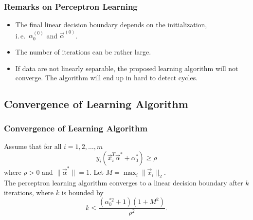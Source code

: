 \begin{frame}
  \frametitle{Remarks on Perceptron Learning \cont}

  \begin{itemize}
    \item The final linear decision boundary depends on the initialization, \\
      i.\,e.\ $\alpha_0^{(0)}$ and $\vec \alpha^{(0)}$. \\[.5cm]
    \item The number of iterations can be rather large. \\[.5cm]
    \item If data are not linearly separable, the proposed learning algorithm will not converge. The algorithm will end up in hard to detect cycles.
  \end{itemize}
\end{frame}


\subsection{Convergence of Learning Algorithm}

\begin{frame}
  \frametitle{Convergence of Learning Algorithm}

  \begin{theorem}
    Assume that for all $i=1,2, \dots, m$
    \begin{displaymath}
      y_i(\vec x_i^T\vec \alpha^* +\alpha^*_0)\geq \rho
    \end{displaymath}
    where $\rho>0$ and $\|\vec \alpha^*\|=1$.
    Let $M= \max_i \|\vec x_i\|_2$. \\[.3cm]
    
    The perceptron learning algorithm converges to a linear decision boundary after $k$ iterations, where $k$ is bounded by
    \begin{displaymath}
      k \leq \frac{(\alpha_0^{*2}+1)(1+M^2)}{\rho^2}.
    \end{displaymath}
  \end{theorem}
\end{frame}


